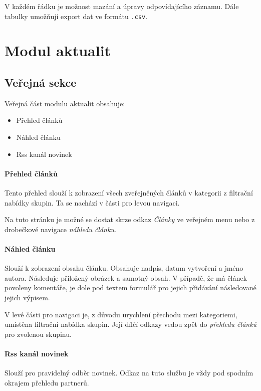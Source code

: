 \documentclass[11pt,oneside]{fithesis}
\begin{document}
            V každém řádku je možnost mazání a úpravy odpovídajícího záznamu. Dále tabulky umožňují export dat ve formátu \verb|.csv|.



        \section{Modul aktualit} 

            \subsection*{Veřejná sekce}
            Veřejná část modulu aktualit obsahuje:
            \begin{itemize}
                \item Přehled článků
                \item Náhled článku
                \item Rss kanál novinek
            \end{itemize}

            \paragraph*{Přehled článků}
             Tento přehled slouží k zobrazení všech zveřejněných článků v kategorii z filtrační nabídky skupin. Ta se nachází v části pro levou navigaci.

             Na tuto stránku je možné se dostat skrze odkaz \textit{Články} ve veřejném menu nebo z drobečkové navigace \textit{náhledu článku}.

            \paragraph*{Náhled článku}\label{doc-nahled-clanku}
            Slouží k zobrazení obsahu článku. Obsahuje nadpis, datum vytvoření a jméno autora. Následuje přiložený obrázek a samotný obsah. V případě, že má článek povoleny komentáře, je dole pod textem formulář pro jejich přidávání následované jejich výpisem. 

            V levé části pro navigaci je, z důvodu urychlení přechodu mezi kategoriemi, umístěna filtrační nabídka skupin. Její dílčí odkazy vedou zpět do \textit{přehledu článků} pro zvolenou skupinu.

            \paragraph*{Rss kanál novinek}
            Slouží pro pravidelný odběr novinek. Odkaz na tuto službu je vždy pod spodním okrajem přehledu partnerů.
\end{document}
